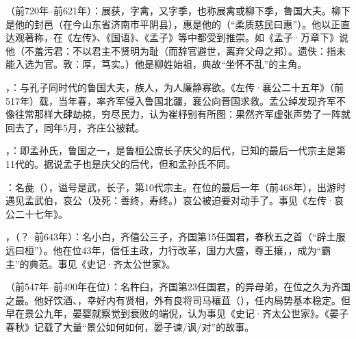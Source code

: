 （前720年--前621年）：展获，字禽，又字季，也称展禽或柳下季，鲁国大夫。柳下是他的封邑（在今山东省济南市平阴县），惠是他的（“柔质慈民曰惠”）。他以正直达观著称，在《左传》、《国语》、《孟子》等中都受到推崇。如《孟子·万章下》说他（不羞污君：不以君主不贤明为耻（而辞官避世，离弃父母之邦）。遗佚：指未能入选为官。敦：厚，笃实。）他是柳姓始祖，典故“坐怀不乱”的主角。

，：与孔子同时代的鲁国大夫，族人，为人廉静寡欲。《左传·襄公二十五年》（前517年）载，当年春，率齐军侵入鲁国北疆，襄公向晋国求救。孟公绰发现齐军不像往常那样大肆劫掠，穷尽民力，认为崔杼别有所图：果然齐军虚张声势了一阵就回去了，同年5月，齐庄公被弑。

，：即孟孙氏，鲁国之一，是鲁桓公庶长子庆父的后代，已知的最后一代宗主是第11代的。据说孟子也是庆父的后代，但和孟孙氏不同。

：名彘（），谥号是武，长子，第10代宗主。在位的最后一年（前468年），出游时遇见孟武伯，哀公（及死：善终，寿终。）哀公被迫要对动手了。事见《左传·哀公二十七年》。

，（？--前643年）：名小白，齐僖公三子，齐国第15任国君，春秋五之首（“辟土服远曰桓”）。他在位43年，信任主政，力行改革，国力大盛，尊王攘，，成为“霸主”的典范。事见《史记·齐太公世家》。

（前547年--前490年在位）：名杵臼，齐国第23任国君，的异母弟，在位之久为齐国之最。他好饮酒、，幸好内有贤相，外有良将司马穰苴（），任内局势基本稳定。但早在景公九年，晏婴就察觉到衰败的端倪，认为事见《史记·齐太公世家》。《晏子春秋》记载了大量“景公如何如何，晏子谏/讽/对”的故事。

